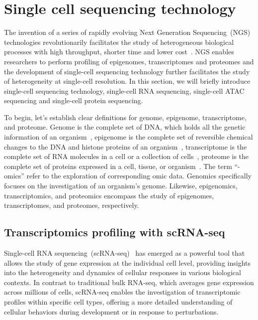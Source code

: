 \section{Single cell sequencing technology}
\label{background:profiling_singlecell}
The invention of a series of rapidly evolving Next Generation Sequencing~(NGS) technologies revolutionarily facilitates the study of heterogeneous biological processes with high throughput, shorter time and lower cost~\citep{svensson2018exponential}. NGS enables researchers to perform profiling of epigenomes, transcriptomes and proteomes and the development of single-cell sequencing technology further facilitates the study of heterogeneity at single-cell resolution. In this section, we will briefly introduce single-cell sequencing technology, single-cell RNA sequencing, single-cell ATAC sequencing and single-cell protein sequencing.

To begin, let's establish clear definitions for genome, epigenome, transcriptome, and proteome. Genome is the complete set of DNA, which holds all the genetic information of an organism~\citep{hubbard2002genome}, epigenome is the complete set of reversible chemical changes to the DNA and histone proteins of an organism~\citep{bernstein2007epigenome}, transcriptome is the complete set of RNA molecules in a cell or a collection of cells~\citep{haoudi2006proteome}, proteome is the complete set of proteins expressed in a cell, tissue, or organism~\citep{wang2009transcriptome}. The term “-omics” refer to the exploration of corresponding omic data. Genomics specifically focuses on the investigation of an organism's genome. Likewise, epigenomics, transcriptomics, and proteomics encompass the study of epigenomes, transcriptomes, and proteomes, respectively.


\subsection{Transcriptomics profiling with scRNA-seq}
\label{background:sec1:scRNA}

Single-cell RNA sequencing~(scRNA-seq)~\citep{singlecellsequencing2014, singlecellsequencing2015} has emerged as a powerful tool that allows the study of gene expression at the individual cell level, providing insights into the heterogeneity and dynamics of cellular responses in various biological contexts. In contrast to traditional bulk RNA-seq, which averages gene expression across millions of cells, scRNA-seq enables the investigation of transcriptomic profiles within specific cell types, offering a more detailed understanding of cellular behaviors during development or in response to perturbations.

